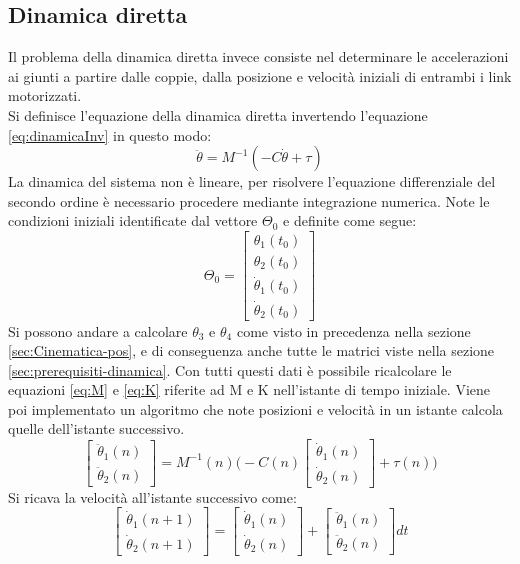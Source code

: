 \subsection{Dinamica diretta}
Il problema della dinamica diretta invece consiste nel determinare le accelerazioni ai giunti a partire dalle coppie, dalla posizione e velocità iniziali di entrambi i link motorizzati.
\\Si definisce l'equazione della dinamica diretta invertendo l'equazione \ref{eq:dinamicaInv} in questo modo:
\begin{equation}
	\ddot{\theta} = M^{-1}(-C\dot{\theta}+\tau)
	\label{eq:dinamicaDiretta}
\end{equation}
La dinamica del sistema non è lineare, per risolvere l'equazione differenziale del secondo ordine è necessario procedere mediante integrazione numerica. Note le condizioni iniziali identificate dal vettore $\Theta_0$ e definite come segue:
\begin{equation*}
    \Theta_0 = \begin{bmatrix}
    \theta_1(t_0) \\ \theta_2(t_0) \\ \dot{\theta}_1(t_0) \\ \dot{\theta}_2(t_0)
    \end{bmatrix}
\end{equation*}
Si possono andare a calcolare $\theta_3$ e $\theta_4$ come visto in precedenza nella sezione \ref{sec:Cinematica-pos}, e di conseguenza anche tutte le matrici viste nella sezione \ref{sec:prerequisiti-dinamica}. Con tutti questi dati è possibile  ricalcolare le equazioni \ref{eq:M} e \ref{eq:K} riferite ad M e K nell'istante di tempo iniziale. Viene poi implementato un algoritmo che note posizioni e velocità in un istante calcola quelle dell'istante successivo.
\begin{equation*}
	\begin{bmatrix}
		\ddot{\theta}_1(n) \\ \ddot{\theta}_2(n)
	\end{bmatrix} = 
 M^{-1}(n)\Bigg( -C(n)\begin{bmatrix}
 	\dot{\theta}_1(n) \\ \dot{\theta}_2(n)
 \end{bmatrix}+\tau(n)\Bigg)
\end{equation*} 
Si ricava la velocità all'istante successivo come:
\begin{equation*}
	\begin{bmatrix}
		\dot{\theta}_1 (n+1) \\ \dot{\theta}_2(n+1)
	\end{bmatrix} = \begin{bmatrix}
	\dot{\theta}_1 (n) \\ \dot{\theta}_2(n)
\end{bmatrix} + \begin{bmatrix}
\ddot{\theta}_1 (n) \\ \ddot{\theta}_2(n)
\end{bmatrix}dt
\end{equation*} 
